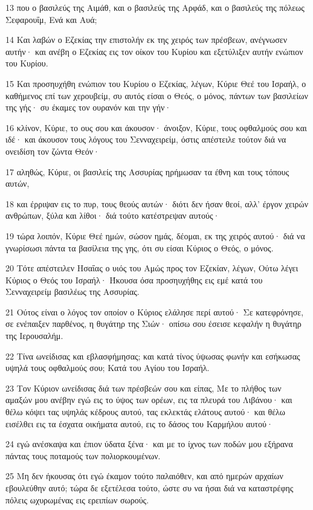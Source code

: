 \par 13 που ο βασιλεύς της Αιμάθ, και ο βασιλεύς της Αρφάδ, και ο βασιλεύς της πόλεως Σεφαρουΐμ, Ενά και Αυά;
\par 14 Και λαβών ο Εζεκίας την επιστολήν εκ της χειρός των πρέσβεων, ανέγνωσεν αυτήν· και ανέβη ο Εζεκίας εις τον οίκον του Κυρίου και εξετύλιξεν αυτήν ενώπιον του Κυρίου.
\par 15 Και προσηυχήθη ενώπιον του Κυρίου ο Εζεκίας, λέγων, Κύριε Θεέ του Ισραήλ, ο καθήμενος επί των χερουβείμ, συ αυτός είσαι ο Θεός, ο μόνος, πάντων των βασιλείων της γής· συ έκαμες τον ουρανόν και την γήν·
\par 16 κλίνον, Κύριε, το ους σου και άκουσον· άνοιξον, Κύριε, τους οφθαλμούς σου και ιδέ· και άκουσον τους λόγους του Σενναχειρείμ, όστις απέστειλε τούτον διά να ονειδίση τον ζώντα Θεόν·
\par 17 αληθώς, Κύριε, οι βασιλείς της Ασσυρίας ηρήμωσαν τα έθνη και τους τόπους αυτών,
\par 18 και έρριψαν εις το πυρ, τους θεούς αυτών· διότι δεν ήσαν θεοί, αλλ' έργον χειρών ανθρώπων, ξύλα και λίθοι· διά τούτο κατέστρεψαν αυτούς·
\par 19 τώρα λοιπόν, Κύριε Θεέ ημών, σώσον ημάς, δέομαι, εκ της χειρός αυτού· διά να γνωρίσωσι πάντα τα βασίλεια της γης, ότι συ είσαι Κύριος ο Θεός, ο μόνος.
\par 20 Τότε απέστειλεν Ησαΐας ο υιός του Αμώς προς τον Εζεκίαν, λέγων, Ούτω λέγει Κύριος ο Θεός του Ισραήλ· Ήκουσα όσα προσηυχήθης εις εμέ κατά του Σενναχειρείμ βασιλέως της Ασσυρίας.
\par 21 Ούτος είναι ο λόγος τον οποίον ο Κύριος ελάλησε περί αυτού· Σε κατεφρόνησε, σε ενέπαιξεν παρθένος, η θυγάτηρ της Σιών· οπίσω σου έσεισε κεφαλήν η θυγάτηρ της Ιερουσαλήμ.
\par 22 Τίνα ωνείδισας και εβλασφήμησας; και κατά τίνος ύψωσας φωνήν και εσήκωσας υψηλά τους οφθαλμούς σου; Κατά του Αγίου του Ισραήλ.
\par 23 Τον Κύριον ωνείδισας διά των πρέσβεών σου και είπας, Με το πλήθος των αμαξών μου ανέβην εγώ εις το ύψος των ορέων, εις τα πλευρά του Λιβάνου· και θέλω κόψει τας υψηλάς κέδρους αυτού, τας εκλεκτάς ελάτους αυτού· και θέλω εισέλθει εις τα έσχατα οικήματα αυτού, εις το δάσος του Καρμήλου αυτού·
\par 24 εγώ ανέσκαψα και έπιον ύδατα ξένα· και με το ίχνος των ποδών μου εξήρανα πάντας τους ποταμούς των πολιορκουμένων.
\par 25 Μη δεν ήκουσας ότι εγώ έκαμον τούτο παλαιόθεν, και από ημερών αρχαίων εβουλεύθην αυτό; τώρα δε εξετέλεσα τούτο, ώστε συ να ήσαι διά να καταστρέφης πόλεις ωχυρωμένας εις ερειπίων σωρούς.
